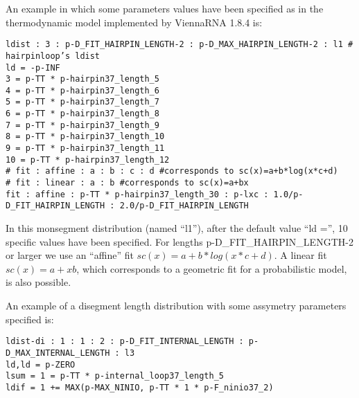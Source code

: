 \noindent
An example in which some parameters values have been specified as in the thermodynamic
model implemented by ViennaRNA 1.8.4 is:\\

\noindent
\begin{scriptsize}
  \texttt{ldist : 3 : p-D\_FIT\_HAIRPIN\_LENGTH-2 : p-D\_MAX\_HAIRPIN\_LENGTH-2  : l1 \# hairpinloop's ldist}\\
\texttt{ld  = -p-INF}\\
\texttt{3   =  p-TT * p-hairpin37\_length\_5}\\
\texttt{4   =  p-TT * p-hairpin37\_length\_6}\\
\texttt{5   =  p-TT * p-hairpin37\_length\_7}\\
\texttt{6   =  p-TT * p-hairpin37\_length\_8}\\
\texttt{7   =  p-TT * p-hairpin37\_length\_9}\\
\texttt{8   =  p-TT * p-hairpin37\_length\_10}\\
\texttt{9   =  p-TT * p-hairpin37\_length\_11}\\
\texttt{10  =  p-TT * p-hairpin37\_length\_12}\\
\texttt{\# fit : affine : a : b : c : d \#corresponds to sc(x)=a+b*log(x*c+d)}\\
\texttt{\# fit : linear : a : b \#corresponds to sc(x)=a+bx}\\
\texttt{fit : affine : p-TT * p-hairpin37\_length\_30 : p-lxc : 1.0/p-D\_FIT\_HAIRPIN\_LENGTH : 2.0/p-D\_FIT\_HAIRPIN\_LENGTH}\\
\end{scriptsize}

\noindent
In this monsegment distribution (named ``l1''), after the default
value ``ld ='', 10 specific values have been specified. For lengths
p-D\_FIT\_HAIRPIN\_LENGTH-2 or larger we use an ``affine'' fit
$sc(x)=a+b*log(x*c+d)$. A linear fit $sc(x)=a+xb$, which corresponds
to a geometric fit for a probabilistic model, is also possible.

\noindent
An example of a disegment length distribution with some assymetry parameters specified is:\\


\noindent
\begin{scriptsize}
  \texttt{ldist-di : 1 : 1 : 2 : p-D\_FIT\_INTERNAL\_LENGTH : p-D\_MAX\_INTERNAL\_LENGTH : l3}\\
\texttt{ld,ld  = p-ZERO}\\
\texttt{lsum = 1   =  p-TT * p-internal\_loop37\_length\_5}\\
\texttt{ldif = 1   +=  MAX(p-MAX\_NINIO, p-TT * 1  * p-F\_ninio37\_2)}\\
\end{scriptsize}

